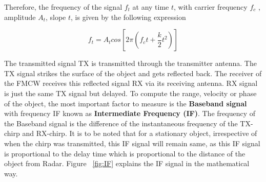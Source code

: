 Therefore, the frequency of the signal \(f_{t}\) at any time \(t\), with carrier frequency \(f_{c}\) , amplitude \(A_{t}\), slope \(t\), is given by the following expression

\[f_{t}= A_{t}cos[2\pi(f_{c}t + \frac{k}{2}t^2)]\]

The transmitted signal TX is transmitted through the transmitter antenna. The TX signal strikes the surface of the object and gets reflected back. The receiver of the FMCW receives this reflected signal RX via its receiving antenna. RX signal is just the same TX signal but delayed.
To compute the range, velocity or phase of the object, the most important factor to measure is the \textbf{Baseband signal} with frequency IF known as \textbf{Intermediate Frequency (IF)}. The frequency of the Baseband signal is the difference of the instantaneous frequency of the TX-chirp and RX-chirp. It is to be noted that for a stationary object, irrespective of when the  chirp was transmitted, this IF signal will remain same, as this IF signal is proportional to the delay time which is proportional to the distance of the object from Radar. Figure ~\ref{fig:IF} explains the IF signal in the mathematical way. 

